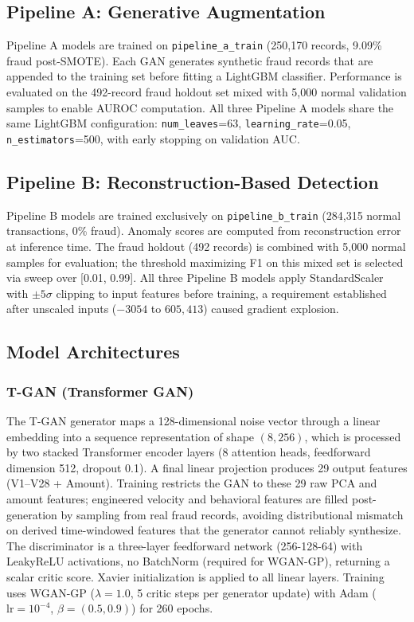 \documentclass[conference]{IEEEtran}
\begin{document}
\subsection{Pipeline A: Generative Augmentation}

Pipeline A models are trained on \texttt{pipeline\_a\_train} (250,170
records, 9.09\% fraud post-SMOTE). Each GAN generates synthetic fraud
records that are appended to the training set before fitting a LightGBM
classifier. Performance is evaluated on the 492-record fraud holdout set
mixed with 5,000 normal validation samples to enable AUROC computation.
All three Pipeline A models share the same LightGBM configuration:
\texttt{num\_leaves}=63, \texttt{learning\_rate}=0.05,
\texttt{n\_estimators}=500, with early stopping on validation AUC.

\subsection{Pipeline B: Reconstruction-Based Detection}

Pipeline B models are trained exclusively on \texttt{pipeline\_b\_train}
(284,315 normal transactions, 0\% fraud). Anomaly scores are computed from
reconstruction error at inference time. The fraud holdout (492 records) is
combined with 5,000 normal samples for evaluation; the threshold maximizing
F1 on this mixed set is selected via sweep over [0.01, 0.99]. All three
Pipeline B models apply StandardScaler with $\pm5\sigma$ clipping to input
features before training, a requirement established after unscaled inputs
($-3054$ to $605,413$) caused gradient explosion.

\subsection{Model Architectures}

\subsubsection{T-GAN (Transformer GAN)}

The T-GAN generator maps a 128-dimensional noise vector through a linear
embedding into a sequence representation of shape $(8, 256)$, which is
processed by two stacked Transformer encoder layers (8 attention heads,
feedforward dimension 512, dropout 0.1). A final linear projection produces
29 output features (V1--V28 + Amount). Training restricts the GAN to these
29 raw PCA and amount features; engineered velocity and behavioral features
are filled post-generation by sampling from real fraud records, avoiding
distributional mismatch on derived time-windowed features that the generator
cannot reliably synthesize. The discriminator is a three-layer feedforward
network (256-128-64) with LeakyReLU activations, no BatchNorm (required for
WGAN-GP), returning a scalar critic score. Xavier initialization is applied
to all linear layers. Training uses WGAN-GP ($\lambda=1.0$, 5 critic steps
per generator update) with Adam ($\text{lr}=10^{-4}$, $\beta=(0.5, 0.9)$)
for 260 epochs.
\end{document}
